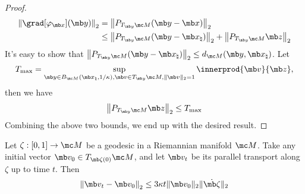 \begin{proof}   
    \begin{equation}
        \begin{aligned}
             \left\|\grad[\varphi_{\mb x}](\mb y) \right\|_2
            &=  \left\| P_{T_{\mb y}\mc M} (\mb y - \mb x)\right\|_2\\
            &\le \left\| P_{T_{\mb y}\mc M} (\mb y - \mb x_\natural)\right\|_2 
            + \left\| P_{T_{\mb y}\mc M} \mb z\right\|_2
        \end{aligned}
    \end{equation}
It's easy to show that $\left\| P_{T_{\mb y}\mc M} (\mb y - \mb x_\natural)\right\|_2 \leq d_{\mc M}(\mb y,\mb x_\natural)$. Let 
\begin{equation}
    T_{\max} = \sup_{\mb y \in B_{\mc M}(\mb x_\natural, 1/\kappa), \mb v \in T_{\mb y } \mc M, \| \mb v \|_2 =1} \innerprod{\mb v}{\mb z},
\end{equation}
then we have
\begin{equation}
    \left\| P_{T_{\mb y}\mc M} \mb z\right\|_2
    \leq T_{\max}
\end{equation}
Combining the above two bounds, we end up with the desired result.
\end{proof}




\begin{lemma}\label{lemma:vecotr-parallel transported vector-comparison}
    Let $\zeta:[0,1] \rightarrow \mc M$ be a geodesic in a Riemannian manifold $\mc M$. Take any initial vector $\mb v_0 \in T_{\mb\zeta(0)}\mc M$, and let $\mb v_t$ be its parallel transport along $\zeta$ up to time $t$. Then 
    \begin{equation}
        \left\| \mb v_t - \mb v_0 \right\|_2
        \leq 3\kappa t \|\mb v_0\|_2 \|\Dot{\mb\zeta}\|_2 
    \end{equation}
\end{lemma}

